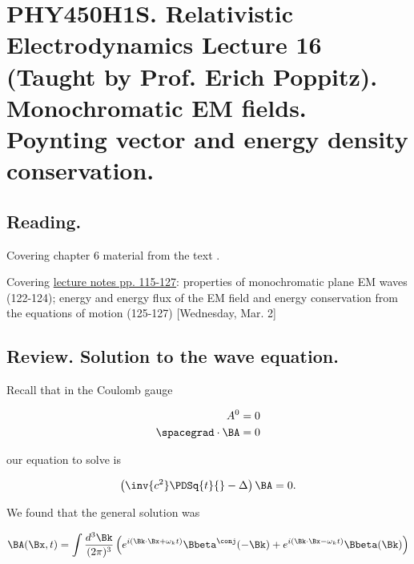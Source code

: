 
%

\chapter{PHY450H1S.  Relativistic Electrodynamics Lecture 16 (Taught by Prof. Erich Poppitz).  Monochromatic EM fields.  Poynting vector and energy density conservation.}
\label{chap:relativisticElectrodynamicsL16}
{}
\date{Mar 2, 2011}

\beginArtNoToc

\section{Reading.}

Covering chapter 6 material from the text \cite{landau1980classical}.

Covering \href{http://www.physics.utoronto.ca/~poppitz/e-poppitz/PHY450_files/RelEMpp115-127.pdf}{lecture notes pp. 115-127}: properties of monochromatic plane EM waves (122-124); energy and energy flux of the EM field and energy conservation from the equations of motion (125-127)  [Wednesday, Mar. 2]

\section{Review.  Solution to the wave equation.}

Recall that in the Coulomb gauge

\begin{align}\label{eqn:relativisticElectrodynamicsL16:10}
A^0 &= 0 \\
\spacegrad \cdot \BA &= 0
\end{align}

our equation to solve is

\begin{equation}\label{eqn:relativisticElectrodynamicsL16:30}
\left( \inv{c^2} \PDSq{t}{} - \Delta \right) \BA = 0.
\end{equation}

We found that the general solution was

\begin{equation}\label{eqn:relativisticElectrodynamicsL16:50}
\BA(\Bx, t) = \int \frac{d^3\Bk}{(2 \pi)^3} \left(
e^{i (\Bk \cdot \Bx + \omega_k t)} \Bbeta^\conj(-\Bk)
+e^{i (\Bk \cdot \Bx - \omega_k t)} \Bbeta(\Bk)
\right)
\end{equation}

